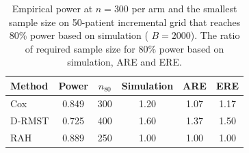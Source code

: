 \begin{table}[ht]
\centering
\caption{Empirical power at $n=300$ per arm and the smallest sample size on  50-patient incremental grid that reaches 80\% power based on simulation ( $B=2000$). The ratio of required sample size for 80\% power based on simulation, ARE and ERE.}
\label{tab:cm057-power-n80}
\begin{tabular}{lccccc}
\toprule
Method & Power & $n_{80}$ & Simulation & ARE & ERE
\\
\midrule
Cox & 0.849 & 300 & 1.20 & 1.07 & 1.17 \\
D-RMST & 0.725 & 400 & 1.60 & 1.37 & 1.50 \\
RAH & 0.889 & 250 & 1.00 & 1.00 & 1.00 \\
\bottomrule
\end{tabular}
\end{table}

